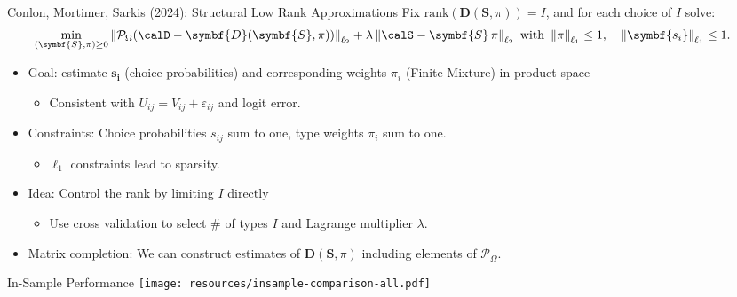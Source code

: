\begin{frame}{Conlon, Mortimer, Sarkis (2024): Structural Low Rank Approximations}
\small
Fix $\textrm{rank}(\symbf{D}(\symbf{S},\pi))=I$, and for each choice of $I$ solve:
\begin{align*}
\min _{(\symbf{S}, \pi) \geq 0} \left\|\mathcal{P}_{\Omega}(\calD-\symbf{D}(\symbf{S},\pi))\right\|_{\ell_2}  &+ \lambda \left\|\calS- \symbf{S}\,\pi \right\|_{\ell_2} \text { with } \left\|\pi  \right\|_{\ell_1} \leq 1, \quad   \left\|\symbf{s_i}  \right\|_{\ell_1} \leq 1.
\end{align*}
\vspace{-.25cm}
\begin{itemize}
\item Goal: estimate $\symbf{s_i}$ (choice probabilities) and corresponding weights $\pi_i$ (Finite Mixture) in \alert{product space}
\begin{itemize}
\item Consistent with $U_{ij} = V_{ij} + \varepsilon_{ij}$ and logit error.
\end{itemize}
\item Constraints: Choice probabilities $s_{ij}$ sum to one, type weights $\pi_i$ sum to one.
\begin{itemize}
\item $\ell_1$ constraints lead to \alert{sparsity}.
\end{itemize}
\item Idea: \alert{Control the rank by limiting $I$ directly}
\begin{itemize}
\item Use cross validation to select \# of types $I$ and Lagrange multiplier $\lambda$.
\end{itemize}
\item Matrix completion: We can construct estimates of $\symbf{D}(\symbf{S},\pi)$ including elements of $\mathcal{P}_{\overline{\Omega}}$.
\end{itemize}
\end{frame}

\begin{frame}{In-Sample Performance}
\label{in_sample}
\centering
\texttt{[image: resources/insample-comparison-all.pdf]}\\
\end{frame}


